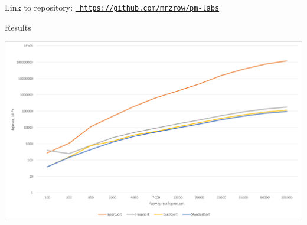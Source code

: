 Link to repository\+: \href{https://github.com/mrzrow/pm-labs}{\texttt{ https\+://github.\+com/mrzrow/pm-\/labs}}

Results 
\begin{DoxyImageNoCaption}
  \mbox{\includegraphics[width=\textwidth,height=\textheight/2,keepaspectratio=true]{graph.png}}
\end{DoxyImageNoCaption}
 